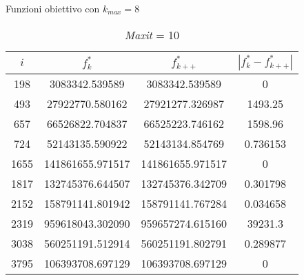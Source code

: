\documentclass[12pt,a4paper,oneside,hidelinks]{report}
\begin{document}
\begin{table}[h]%
	\centering
	\caption{Funzioni obiettivo con $k_{max} = 8$}\label{tab:b2}

	\def\arraystretch{1.4}

	\begin{subtable}{\textwidth}
		\centering
		\begin{tabular}{|S[table-parse-only = true]
						|S[table-format = 9.6, table-number-alignment = center]
						|S[table-format = 9.6, table-number-alignment = center]
						|S[table-parse-only = true]|}
			
			\hline			
			{$i$} & {$f_{k}^*$} & {$f_{k++}^*$} & {$|f_{k}^* - f_{k++}^*|$} \\			
			
			\hline		
			
			198  &  3083342.539589   & 3083342.539589   & 0  \\
			493  &  27922770.580162  & 27921277.326987  & 1493.25 \\
			657  &  66526822.704837  & 66525223.746162  & 1598.96 \\
			724  &  52143135.590922  & 52143134.854769  & 0.736153 \\
			1655 &  141861655.971517 & 141861655.971517 & 0 \\
			1817 &  132745376.644507 & 132745376.342709 & 0.301798 \\
			2152 &	158791141.801942 & 158791141.767284 & 0.034658 \\
			2319 &  959618043.302090 & 959657274.615160 & 39231.3 \\
			3038 &  560251191.512914 & 560251191.802791 & 0.289877 \\
			3795 &  106393708.697129 & 106393708.697129 & 0 \\
			
			\hline
		\end{tabular}	
			
		\vspace*{0.4 cm}
		\caption{\textit{Maxit} = 10}
	\end{subtable}%
\end{table}

\vspace*{\fill}

\clearpage

\vspace*{\fill}
\end{document}

